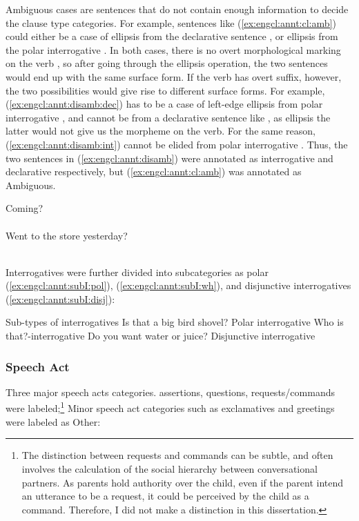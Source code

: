 Ambiguous cases are sentences that do not contain enough information to decide the clause type categories. For example, sentences like (\ref{ex:engcl:annt:cl:amb}) could either be a case of ellipsis from the declarative sentence , or ellipsis from the polar interrogative . In both cases, there is no overt morphological marking on the verb , so after going through the ellipsis operation, the two sentences would end up with the same surface form. If the verb has overt suffix, however, the two possibilities would give rise to different surface forms. For example,(\ref{ex:engcl:annt:disamb:dec}) has to be a case of left-edge ellipsis from polar interrogative , and cannot be from a declarative sentence like , as ellipsis the latter would not give us the  morpheme on the verb. For the same reason, (\ref{ex:engcl:annt:disamb:int}) cannot be elided from polar interrogative . Thus, the two sentences in (\ref{ex:engcl:annt:disamb}) were annotated as interrogative and declarative respectively, but (\ref{ex:engcl:annt:cl:amb}) was annotated as Ambiguous.

\bxl\label{ex:engcl:annt:disamb:dec} Coming? \\
\cmark {}\\
\xmark {}
\ex \label{ex:engcl:annt:disamb:int} Went to the store yesterday? \\
\cmark {}\\
\xmark {}
\exl
\eex

Interrogatives were further divided into subcategories as polar (\ref{ex:engcl:annt:subI:pol}), \twh{} (\ref{ex:engcl:annt:subI:wh}), and disjunctive interrogatives (\ref{ex:engcl:annt:subI:disj}):

	Sub-types of interrogatives
\bxl\label{ex:engcl:annt:subI:pol}
Is that a big bird shovel? \hfill	Polar interrogative
\ex\label{ex:engcl:annt:subI:wh}	Who is that?\hfill	\twh-interrogative
\ex\label{ex:engcl:annt:subI:disj}	Do you want water or juice? \hfill Disjunctive interrogative
\exl
\eex

\subsubsection{Speech Act}

Three major speech acts categories. assertions, questions, requests/commands were labeled;\footnote{The distinction between requests and commands can be subtle, and often involves the calculation of the social hierarchy between conversational partners. As parents hold authority over the child, even if the parent intend an utterance to be a request, it could be perceived by the child as a command. Therefore, I did not make a distinction in this dissertation.} Minor speech act categories such as exclamatives and greetings were labeled as Other:

